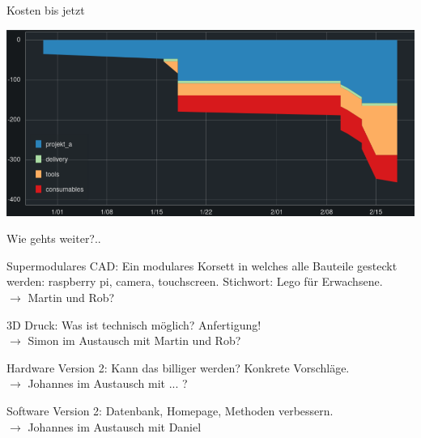 \documentclass{beamer}
\begin{document}
\begin{frame}{Kosten bis jetzt}

\begin{center}
    \includegraphics[width=\textwidth]{fig_kniffelbot_kosten}
\end{center}

\end{frame}


\begin{frame}{Wie gehts weiter?..}

\begin{exampleblock}{Supermodulares CAD:}
Ein modulares Korsett in welches alle Bauteile gesteckt werden: raspberry pi, camera, touchscreen. Stichwort: Lego f\"ur Erwachsene.\\
$\rightarrow$ Martin und Rob?
\end{exampleblock}

\begin{exampleblock}{3D Druck:}
Was ist technisch m\"oglich? Anfertigung!\\
$\rightarrow$ Simon im Austausch mit Martin und Rob?
\end{exampleblock}

\begin{exampleblock}{Hardware Version 2:}
Kann das billiger werden? Konkrete Vorschl\"age.\\
$\rightarrow$ Johannes im Austausch mit ... ?
\end{exampleblock}

\begin{exampleblock}{Software Version 2:}
Datenbank, Homepage, Methoden verbessern.\\
$\rightarrow$ Johannes im Austausch mit Daniel
\end{exampleblock}

\end{frame}
\end{document}
